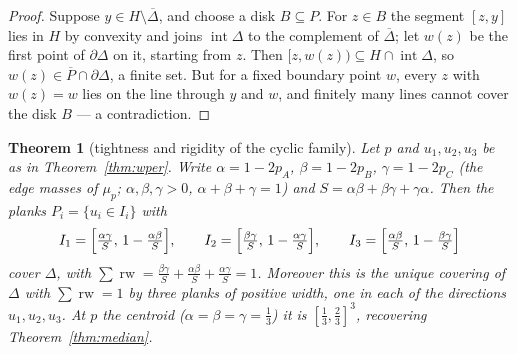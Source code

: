 \documentclass[11pt,reqno]{amsart}
\theoremstyle{plain}
\newtheorem{theorem}{Theorem}[section]
\theoremstyle{definition}
\theoremstyle{remark}
\newcommand{\rw}{\operatorname{rw}}
\begin{document}
\begin{proof}
Suppose $y\in H\setminus\overline\Delta$, and choose a disk $B\subseteq P$. For
$z\in B$ the segment $[z,y]$ lies in $H$ by convexity and joins
$\operatorname{int}\Delta$ to the complement of $\overline\Delta$; let $w(z)$ be
the first point of $\partial\Delta$ on it, starting from $z$. Then
$[z,w(z))\subseteq H\cap\operatorname{int}\Delta$, so
$w(z)\in\overline P\cap\partial\Delta$, a finite set. But for a fixed boundary
point $w$, every $z$ with $w(z)=w$ lies on the line through $y$ and $w$, and
finitely many lines cannot cover the disk $B$ --- a contradiction.
\end{proof}

\begin{theorem}[tightness and rigidity of the cyclic family]\label{thm:tight}
Let $p$ and $u_1,u_2,u_3$ be as in Theorem~\ref{thm:wper}. Write
$\alpha=1-2p_A$, $\beta=1-2p_B$, $\gamma=1-2p_C$ (the edge masses of $\mu_p$;
$\alpha,\beta,\gamma>0$, $\alpha+\beta+\gamma=1$) and
$S=\alpha\beta+\beta\gamma+\gamma\alpha$. Then the planks $P_i=\{u_i\in I_i\}$
with
\[
I_1=\Bigl[\tfrac{\alpha\gamma}S,\,1-\tfrac{\alpha\beta}S\Bigr],\qquad
I_2=\Bigl[\tfrac{\beta\gamma}S,\,1-\tfrac{\alpha\gamma}S\Bigr],\qquad
I_3=\Bigl[\tfrac{\alpha\beta}S,\,1-\tfrac{\beta\gamma}S\Bigr]
\]
cover $\Delta$, with $\sum\rw
=\tfrac{\beta\gamma}S+\tfrac{\alpha\beta}S+\tfrac{\alpha\gamma}S=1$. Moreover
this is the unique covering of $\Delta$ with $\sum\rw=1$ by three planks of
positive width, one in each of the directions $u_1,u_2,u_3$. At $p$ the centroid
($\alpha=\beta=\gamma=\tfrac13$) it is $[\tfrac13,\tfrac23]^3$, recovering
Theorem~\ref{thm:median}.
\end{theorem}
\end{document}
